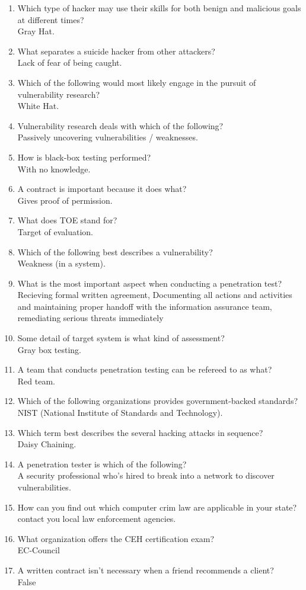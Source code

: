 \begin{enumerate}
    \item Which type of hacker may use their skills for both benign and malicious goals at different times?\\Gray Hat.
    \item What separates a suicide hacker from other attackers?\\Lack of fear of being caught.
    \item Which of the following would most likely engage in the pursuit of vulnerability research?\\White Hat.
    \item Vulnerability research deals with which of the following?\\Passively uncovering vulnerabilities / weaknesses.
    \item How is black-box testing performed?\\With no knowledge.
    \item A contract is important because it does what?\\Gives proof of  permission.
    \item What does TOE stand for?\\Target of evaluation.
    \item Which of the following best describes a vulnerability?\\Weakness (in a system).
    \item What is the most important aspect when conducting a penetration test?\\Recieving formal written agreement, Documenting all actions and activities and maintaining proper handoff with the information assurance team, remediating serious threats immediately
    \item Some detail of target system is what kind of assessment?\\Gray box testing.
    \item A team that conducts penetration testing can be refereed to as what?\\Red team.
    \item Which of the following organizations provides government-backed standards?\\NIST (National Institute of Standards and Technology).
    \item Which term best describes the several hacking attacks in sequence?\\Daisy Chaining.
    \item A penetration tester is which of the following?\\A security professional who's hired to break into a network to discover vulnerabilities.
    \item How can you find out which computer crim law are applicable in your state?\\contact you local law enforcement agencies.
    \item What organization offers the CEH certification exam?\\EC-Council
    \item A written contract isn't necessary when a friend recommends a client?\\False
\end{enumerate}

